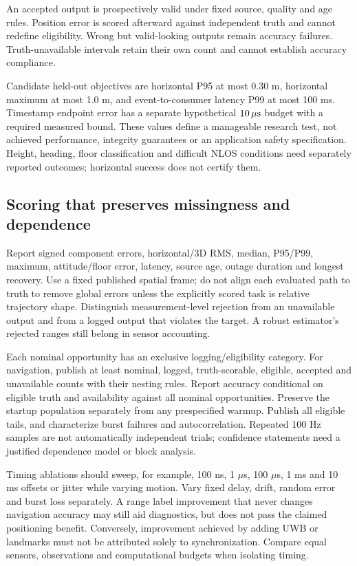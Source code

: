 \documentclass[11pt,letterpaper]{article}
\begin{document}
An accepted output is prospectively valid under fixed source, quality and age rules. Position error is scored afterward against independent truth and cannot redefine eligibility. Wrong but valid-looking outputs remain accuracy failures. Truth-unavailable intervals retain their own count and cannot establish accuracy compliance.

Candidate held-out objectives are horizontal P95 at most 0.30 m, horizontal maximum at most 1.0 m, and event-to-consumer latency P99 at most 100 ms. Timestamp endpoint error has a separate hypothetical $10\,\mu\mathrm{s}$ budget with a required measured bound. These values define a manageable research test, not achieved performance, integrity guarantees or an application safety specification. Height, heading, floor classification and difficult NLOS conditions need separately reported outcomes; horizontal success does not certify them.

\subsection{Scoring that preserves missingness and dependence}
Report signed component errors, horizontal/3D RMS, median, P95/P99, maximum, attitude/floor error, latency, source age, outage duration and longest recovery. Use a fixed published spatial frame; do not align each evaluated path to truth to remove global errors unless the explicitly scored task is relative trajectory shape. Distinguish measurement-level rejection from an unavailable output and from a logged output that violates the target. A robust estimator's rejected ranges still belong in sensor accounting.

Each nominal opportunity has an exclusive logging/eligibility category. For navigation, publish at least nominal, logged, truth-scorable, eligible, accepted and unavailable counts with their nesting rules. Report accuracy conditional on eligible truth and availability against all nominal opportunities. Preserve the startup population separately from any prespecified warmup. Publish all eligible tails, and characterize burst failures and autocorrelation. Repeated 100 Hz samples are not automatically independent trials; confidence statements need a justified dependence model or block analysis.

Timing ablations should sweep, for example, 100 ns, 1 $\mu$s, 100 $\mu$s, 1 ms and 10 ms offsets or jitter while varying motion. Vary fixed delay, drift, random error and burst loss separately. A range label improvement that never changes navigation accuracy may still aid diagnostics, but does not pass the claimed positioning benefit. Conversely, improvement achieved by adding UWB or landmarks must not be attributed solely to synchronization. Compare equal sensors, observations and computational budgets when isolating timing.
\end{document}
